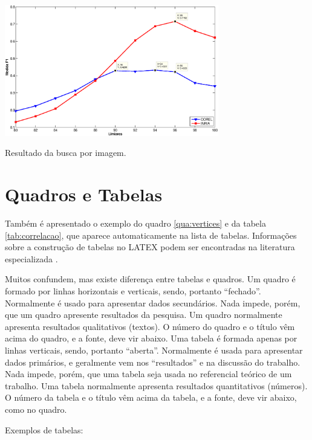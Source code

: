 \begin{grafico}[!htb]
	\centering
	\includegraphics[width=0.7\textwidth]{./graficos/buscaimg.eps}
	\caption[Resultado da busca por imagem]{Resultado da busca por imagem.}
	\label{chr:buscaimg}
\end{grafico}

\section{Quadros e Tabelas}
\label{sec:tabelas}

Também é apresentado o exemplo do quadro \ref{qua:vertices} e da tabela \ref{tab:correlacao}, que aparece automaticamente na lista de tabelas. Informações sobre a construção de tabelas no LATEX podem ser encontradas na literatura especializada \cite{Lamport1986,Buerger1989,Kopka2003,Mittelbach2004}.



Muitos confundem, mas existe diferença entre tabelas e quadros.
Um quadro é formado por linhas horizontais e verticais,
sendo, portanto ``fechado''. Normalmente é usado
para apresentar dados secundários. Nada impede, porém,
que um quadro apresente resultados da pesquisa.
Um quadro normalmente apresenta resultados
qualitativos (textos). O número do quadro e o título
vêm acima do quadro, e a fonte, deve vir abaixo.
Uma tabela é formada apenas por linhas verticais, sendo,
portanto ``aberta''. Normalmente é usada para
apresentar dados primários, e geralmente vem nos
“resultados” e na discussão do trabalho. Nada
impede, porém, que uma tabela seja usada no
referencial teórico de um trabalho. Uma tabela
normalmente apresenta resultados quantitativos
(números). O número da tabela e o título vêm
acima da tabela, e a fonte, deve vir abaixo, como
no quadro.

Exemplos de tabelas:





